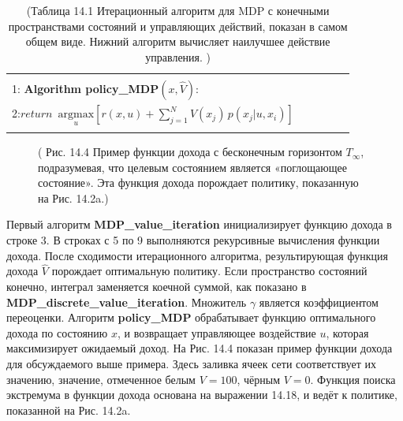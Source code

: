 \documentclass[10pt,a4paper]{article}
\begin{document}
\begin{table}[H]
\begin{center}
\begin{tabular}{|l|}
\hline
{}\\
1:\textbf{ Algorithm policy\_MDP}$(x,\hat{V}):\qquad\quad\qquad\qquad\qquad\qquad\qquad$\\
2:\hspace{5mm}$\textit{return}\,\,\,\underset{u}{\text{argmax}}\left[r(x,u)+\sum_{j=1}^N \hat{V}(x_j)\,p(x_j|u,x_i) \right]$\\
{}\\
\hline
\end{tabular}
\caption{(Таблица 14.1 Итерационный алгоритм для MDP с конечными пространствами состояний и управляющих действий, показан в самом общем виде. Нижний алгоритм вычисляет наилучшее действие управления. )}
\end{center}
\end{table}			
\begin{figure}[H]
	\caption{ ( Рис. 14.4 Пример функции дохода с бесконечным горизонтом $T_\infty$, подразумевая, что целевым состоянием является «поглощающее состояние». Эта функция дохода порождает политику, показанную на Рис. 14.2a.) }
	\label{fig:144orig}
\end{figure}			
Первый алгоритм \textbf{MDP\_value\_iteration} инициализирует функцию дохода в строке 3. В строках с 5 по 9 выполняются рекурсивные вычисления функции дохода. После сходимости итерационного алгоритма, результирующая функция дохода $\hat{V}$ порождает оптимальную политику. Если пространство состояний конечно, интеграл заменяется коечной суммой, как показано в \textbf{MDP\_discrete\_value\_iteration}. Множитель $\gamma$ является коэффициентом переоценки. Алгоритм \textbf{policy\_MDP} обрабатывает функцию оптимального дохода по состоянию $x$, и возвращает управляющее воздействие $u$, которая максимизирует ожидаемый доход.			
На Рис. 14.4 показан пример функции дохода для обсуждаемого выше примера. Здесь заливка ячеек сети соответствует их значению, значение, отмеченное белым $V = 100$, чёрным $V = 0$. Функция поиска экстремума в функции дохода основана на выражении 14.18, и ведёт к политике, показанной на Рис. 14.2a.\\			
			
\end{document}
